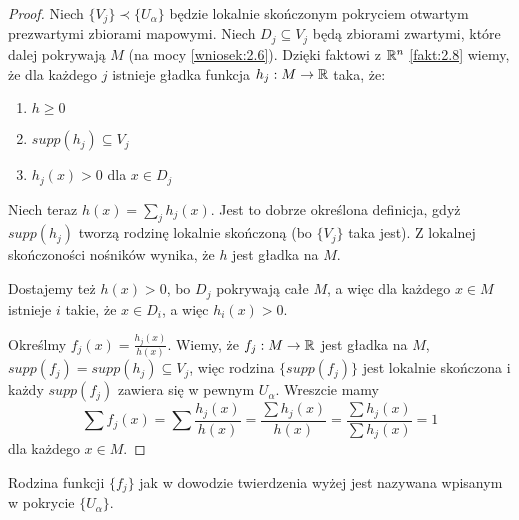 \begin{proof}
Niech $\{V_j\}\prec\{U_\alpha\}$ będzie lokalnie skończonym pokryciem otwartym prezwartymi zbiorami mapowymi. Niech $D_j\subseteq V_j$ będą zbiorami zwartymi, które dalej pokrywają $M$ (na mocy \ref{wniosek:2.6}). Dzięki faktowi z $\mathbb{R}^n$ \ref{fakt:2.8} wiemy, że dla każdego $j$ istnieje gładka funkcja $h_j:M\to\mathbb{R}$ taka, że:
\begin{enumerate}
  \item $h\geq 0$
  \item $supp(h_j)\subseteq V_j$
  \item $h_j(x)>0$ dla $x\in D_j$
\end{enumerate}

Niech teraz $h(x)=\sum_jh_j(x)$. Jest to dobrze określona definicja, gdyż $supp(h_j)$ tworzą rodzinę lokalnie skończoną (bo $\{V_j\}$ taka jest). Z lokalnej skończoności nośników wynika, że $h$ jest gładka na $M$.

Dostajemy też $h(x)>0$, bo $D_j$ pokrywają całe $M$, a więc dla każdego $x\in M$ istnieje $i$ takie, że $x\in D_i$, a więc $h_i(x)>0$.

Określmy $f_j(x)=\frac{h_j(x)}{h(x)}$. Wiemy, że $f_j:M\to\mathbb{R}$ jest gładka na $M$, $supp(f_j)=supp(h_j)\subseteq V_j$, więc rodzina $\{supp(f_j)\}$ jest lokalnie skończona i każdy $supp(f_j)$ zawiera się w pewnym $U_\alpha$. Wreszcie mamy
$$\sum f_j(x)=\sum\frac{h_j(x)}{h(x)}=\frac{\sum h_j(x)}{h(x)}=\frac{\sum h_j(x)}{\sum h_j(x)}=1$$
dla każdego $x\in M$.
\end{proof}

\begin{definition} Rodzina funkcji $\{f_j\}$ jak w dowodzie twierdzenia wyżej jest nazywana  wpisanym w pokrycie $\{U_\alpha\}$.
\end{definition}
